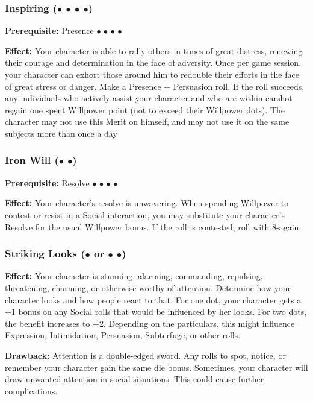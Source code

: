 \documentclass["../Misguided by Starlight.tex"]{subfiles}
\begin{document}
	\subsubsection{Inspiring ($\bullet$ $\bullet$ $\bullet$ $\bullet$)} %
		\textbf{Prerequisite:} Presence $\bullet$ $\bullet$ $\bullet$ $\bullet$
		
		\textbf{Effect:} Your character is able to rally others in times of great distress, renewing their courage and determination in the face of adversity. Once per game session, your character can exhort those around him to redouble their efforts in the face of great stress or danger. Make a Presence + Persuasion roll. If the roll succeeds, any individuals who actively assist your character and who are within earshot regain one spent Willpower point (not to exceed their Willpower dots). The character may not use this Merit on himself, and may not use it on the same subjects more than once a day
	
	\subsubsection{Iron Will ($\bullet$ $\bullet$)} %
		\textbf{Prerequisite:} Resolve  $\bullet$ $\bullet$ $\bullet$ $\bullet$
		
		\textbf{Effect:} Your character’s resolve is unwavering. When spending Willpower to contest or resist in a Social interaction, you may substitute your character’s Resolve for the usual Willpower bonus. If the roll is contested, roll with 8-again.
	
	\subsubsection{Striking Looks ($\bullet$ or $\bullet$ $\bullet$)} %
		\textbf{Effect:} Your character is stunning, alarming, commanding, repulsing, threatening, charming, or otherwise worthy of attention. Determine how your character looks and how people react to that. For one dot, your character gets a +1 bonus on any Social rolls that would be influenced by her looks. For two dots, the benefit increases to +2. Depending on the particulars, this might influence Expression, Intimidation, Persuasion, Subterfuge, or other rolls. 
		
		\textbf{Drawback:} Attention is a double-edged sword. Any rolls to spot, notice, or remember your character gain the same die bonus. Sometimes, your character will draw unwanted attention in social situations. This could cause further complications.
	
\end{document}
